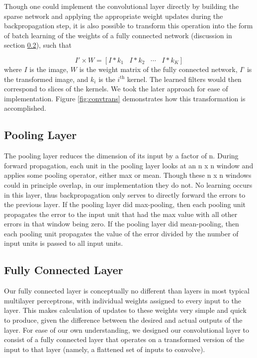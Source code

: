\documentclass[10pt,twocolumn,letterpaper]{article}
\begin{document}
Though one could implement the convolutional layer directly by building the sparse network and
applying the appropriate weight updates during the backpropagation step, it is also possible to
transform this operation into the form of batch learning of the weights of a fully connected
network (discussion in section \ref{sec:full}), such that

$$ I' \times W = [I*k_1 \hspace{10pt} I*k_2 \hspace{10pt} \cdots \hspace{10pt} I*k_K]$$
where $I$ is the image, $W$ is the weight matrix of the fully connected network, $I$’ is the transformed
image, and $k_i$ is the $i^{\text{th}}$ kernel. The learned filters would then correspond to slices of the kernels.
We took the later approach for ease of implementation. Figure \ref{fig:convtrans} demonstrates how this transformation
is accomplished.


\subsection{Pooling Layer}

The pooling layer reduces the dimension of its input by a factor of n. During forward propagation, each
unit in the pooling layer looks at an n x n window and applies some pooling operator, either max or mean.
Though these n x n windows could in principle overlap, in our implementation they do not. No learning occurs
in this layer, thus backpropagation only serves to directly forward the errors to the previous layer.
If the pooling layer did max-pooling, then each pooling unit propagates the error to the input unit that
had the max value with all other errors in that window being zero. If the pooling layer did mean-pooling,
then each pooling unit propagates the value of the error divided by the number of input units is passed to all input units.


\subsection{Fully Connected Layer}
\label{sec:full}

Our fully connected layer is conceptually no different than layers in most typical multilayer
perceptrons, with individual weights assigned to every input to the layer.
This makes calculation of updates to these weights very simple and quick to produce, given the
difference between the desired and actual outputs of the layer.
For ease of our own understanding, we designed our convolutional layer to consist of a
fully connected layer that operates on a transformed version of the input to that layer
(namely, a flattened set of inputs to convolve).
\end{document}
